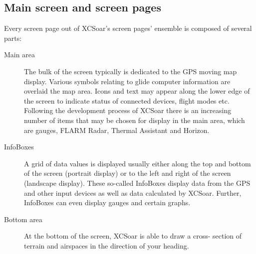 \subsection*{Main screen and screen pages}
Every screen page out of XCSoar's screen pages' ensemble is composed of several 
parts:
\begin{description}
\item[Main area] The bulk of the screen typically is dedicated to the GPS moving 
map display. Various symbols relating to glide computer information are overlaid 
the map area. Icons and text may appear along the lower edge of the screen
to indicate status of connected devices, flight modes etc.
Following the development process of XCSoar there is an increasing number of 
items that may be chosen for display in the main area, which are gauges,
FLARM Radar, Thermal Assistant and Horizon.
\item[InfoBoxes] A grid of data values is displayed usually either along
the top and bottom of the screen (portrait display) or to the left and right of the
screen (landscape display).  These so-called InfoBoxes display data from the
GPS and other input devices as well as data calculated by XCSoar. Further, 
InfoBoxes can even display gauges and certain graphs.
\item[Bottom area] At the bottom of the screen, XCSoar is able to draw a cross-
section of terrain and airspaces in the direction of your heading.
\end{description}

